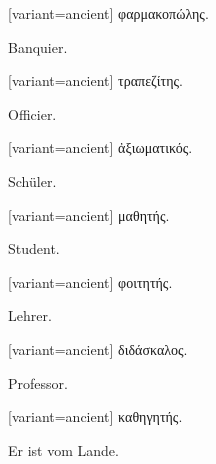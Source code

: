 \begin{greek}[variant=ancient]%
φαρμακοπώλης.

\end{greek}%
\egroup\switchcolumn*\bgroup

Banquier. 

\egroup\switchcolumn\bgroup

\begin{greek}[variant=ancient]%
τραπεζίτης.

\end{greek}%
\egroup\switchcolumn*\bgroup

Officier. 

\egroup\switchcolumn\bgroup

\begin{greek}[variant=ancient]%
ἀξιωματικός.

\end{greek}%
\egroup\switchcolumn*\bgroup

Schüler. 

\egroup\switchcolumn\bgroup

\begin{greek}[variant=ancient]%
μαθητής.

\end{greek}%
\egroup\switchcolumn*\bgroup

Student. 

\egroup\switchcolumn\bgroup

\begin{greek}[variant=ancient]%
φοιτητής.

\end{greek}%
\egroup\switchcolumn*\bgroup

Lehrer. 

\egroup\switchcolumn\bgroup

\begin{greek}[variant=ancient]%
διδάσκαλος.

\end{greek}%
\egroup\switchcolumn*\bgroup

Professor. 

\egroup\switchcolumn

\begin{greek}[variant=ancient]%
καθηγητής.

\end{greek}%
\switchcolumn*

Er ist vom Lande. 

